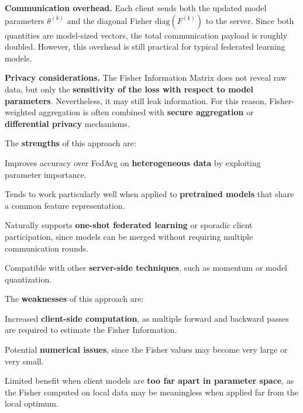 \textbf{Communication overhead.}  
Each client sends both the updated model parameters $\theta^{(k)}$ and the diagonal Fisher
$\mathrm{diag}(F^{(k)})$ to the server. Since both quantities are model-sized vectors, the
total communication payload is roughly doubled. However, this overhead is still practical
for typical federated learning models.

\textbf{Privacy considerations.}  
The Fisher Information Matrix does not reveal raw data, but only the \textbf{sensitivity of
the loss with respect to model parameters}. Nevertheless, it may still leak information.
For this reason, Fisher-weighted aggregation is often combined with \textbf{secure
aggregation} or \textbf{differential privacy} mechanisms.

\vspace{0.3cm}

The \textbf{strengths} of this approach are:
\begin{compactitemize}
    \item Improves accuracy over FedAvg on \textbf{heterogeneous data} by exploiting
    parameter importance.
    \item Tends to work particularly well when applied to \textbf{pretrained models} that
    share a common feature representation.
    \item Naturally supports \textbf{one-shot federated learning} or sporadic client
    participation, since models can be merged without requiring multiple communication
    rounds.
    \item Compatible with other \textbf{server-side techniques}, such as momentum or model
    quantization.
\end{compactitemize}

The \textbf{weaknesses} of this approach are:
\begin{compactitemize}
    \item Increased \textbf{client-side computation}, as multiple forward and backward
    passes are required to estimate the Fisher Information.
    \item Potential \textbf{numerical issues}, since the Fisher values may become very large
    or very small.
    \item Limited benefit when client models are \textbf{too far apart in parameter space},
    as the Fisher computed on local data may be meaningless when applied far from the local
    optimum.
\end{compactitemize}

